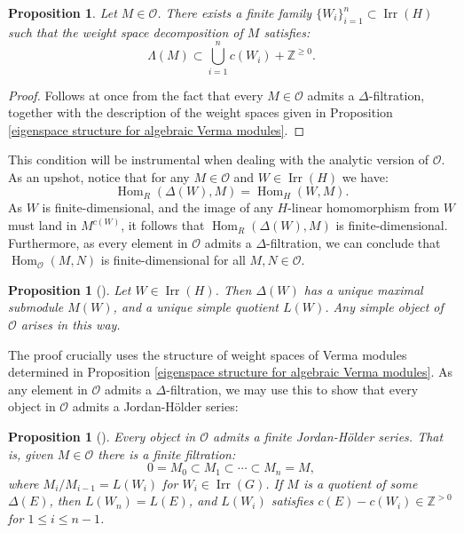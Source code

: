 \documentclass{amsart}
\newtheorem{prop}[defi]{ Proposition}
\newcommand{\Hom}{\operatorname{Hom}}
\newcommand{\OX}{\mathcal{O}}
\begin{document}
\begin{prop}\label{prop weight spaces elements in OX}
Let $M\in\OX$. There exists a finite family $\{W_i \}_{i=1}^n\subset \operatorname{Irr}(H)$ such that the weight space decomposition of $M$ satisfies:
\begin{equation*}
    \Lambda(M)\subset \bigcup_{i=1}^nc(W_i)+\mathbb{Z}^{\geq 0}.
\end{equation*}
\end{prop}
\begin{proof}
    Follows at once from the fact that every $M\in\OX$ admits a $\Delta$-filtration, together with the description of the weight spaces given in Proposition \ref{eigenspace structure for algebraic Verma modules}.
\end{proof}
This  condition will be instrumental when dealing with the analytic version of $\OX$. As an upshot, notice that for any $M\in\OX$ and $W\in\operatorname{Irr}(H)$ we have:
\begin{equation*}
    \Hom_R(\Delta(W),M)=\Hom_H(W,M).
\end{equation*}
As $W$ is finite-dimensional, and the image of any $H$-linear homomorphism from $W$ must land in $M^{c(W)}$, it follows that $\Hom_R(\Delta(W),M)$ is finite-dimensional. Furthermore, as every element in $\OX$ admits a $\Delta$-filtration, we can conclude that $\Hom_{\OX}(M,N)$ is finite-dimensional for all $M,N\in \OX$.
\begin{prop}[{\cite[Proposition 3.29.]{etingof2010lecture}}]
Let $W\in\operatorname{Irr}(H)$. Then $\Delta(W)$ has a unique maximal submodule $M(W)$, and a unique simple quotient $L(W)$. Any simple object of $\OX$ arises in this way.
\end{prop}
The proof crucially uses the structure of weight spaces of Verma modules determined in Proposition \ref{eigenspace structure for algebraic Verma modules}. As any element in $\OX$ admits a $\Delta$-filtration, we may use this to show that every object in $\OX$ admits a Jordan-Hölder series:
\begin{prop}[{\cite[Lemma 2.14, Corollary 2.16.]{ginzburg2003category}}]\label{JH series in algebraic O}
Every object in $\OX$ admits a finite Jordan-Hölder series. That is, given $M\in \OX$ there is a finite filtration:
\begin{equation*}
    0=M_0\subset M_1\subset \cdots\subset M_n=M,
\end{equation*}
where $M_{i}/M_{i-1}=L(W_i)$ for $W_i\in \operatorname{Irr}(G)$. If $M$ is a quotient of some $\Delta(E)$, then $L(W_n)=L(E)$, and  $L(W_i)$ satisfies $c(E)-c(W_i)\in \mathbb{Z}^{>0}$ for $1\leq i \leq n-1$.
\end{prop}
\end{document}
